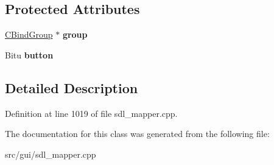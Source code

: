 \subsection*{Protected Attributes}
\begin{DoxyCompactItemize}
\item 
\hypertarget{classCJButtonBind_ade264023f83ad0202a6c5a2340d46833}{\hyperlink{classCBindGroup}{C\-Bind\-Group} $\ast$ {\bfseries group}}\label{classCJButtonBind_ade264023f83ad0202a6c5a2340d46833}

\item 
\hypertarget{classCJButtonBind_a6ef33ff006d574b8ea0df3ac18bf1a7a}{Bitu {\bfseries button}}\label{classCJButtonBind_a6ef33ff006d574b8ea0df3ac18bf1a7a}

\end{DoxyCompactItemize}


\subsection{Detailed Description}


Definition at line 1019 of file sdl\-\_\-mapper.\-cpp.



The documentation for this class was generated from the following file\-:\begin{DoxyCompactItemize}
\item 
src/gui/sdl\-\_\-mapper.\-cpp\end{DoxyCompactItemize}
